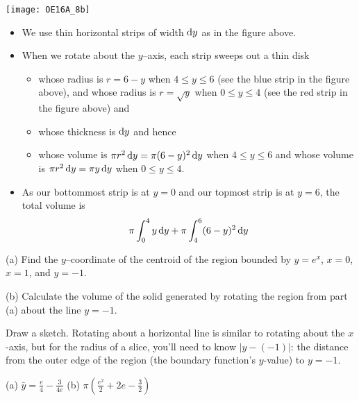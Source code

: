 \begin{solution}
\begin{center}
       \texttt{[image: OE16A\_8b]}
\end{center}

\noindent
 \begin{itemize}
\item We use thin horizontal  strips of width $\mathrm{d}y$ as in the figure  above.

\item When we rotate about the $y$--axis, each strip
sweeps out a thin disk
\begin{itemize}
\item
whose radius is $r=6-y$ when $4\le y\le 6$
(see the blue strip in the figure above),  and
whose radius is $r=\sqrt{y}$ when $0\le y\le 4$
(see the red strip in the figure above) and
\item
whose thickness is $\mathrm{d}y$ and hence
\item
whose volume is
$\pi r^2\,\mathrm{d}y
       = \pi(6-y)^2\,\mathrm{d}y$ when $4\le y\le 6$ and  whose volume is
$\pi r^2\,\mathrm{d}y
    =\pi y\,\mathrm{d}y$
when $0\le y\le 4$.

\end{itemize}
\item As our bottommost strip is at $y=0$ and our topmost
strip is at $y=6$, the total volume is
\begin{align*}
\pi \int_0^4 y\,\mathrm{d}y + \pi \int_4^6 (6-y)^2\,\mathrm{d}y
\end{align*}
\end{itemize}

\end{solution}


\begin{question}[2014D]
(a)
Find the $y$--coordinate of the centroid of the region bounded by
$y = e^x$, $x = 0$, $x = 1$, and $y = -1$.

\noindent (b)
Calculate the volume of the solid generated by rotating the region
from part (a) about the line $y = -1$.

\end{question}

\begin{hint}
Draw a sketch. Rotating about a horizontal line is similar to rotating about the $x$-axis, but for the radius of a slice, you'll need to know $|y-(-1)|$: the distance from the outer edge of the region (the boundary function's $y$-value) to $y=-1$.
\end{hint}

\begin{answer}
(a) $\displaystyle\bar y = \frac{e}{4} - \frac{3}{4e} $
\qquad (b) $\displaystyle\pi\left(\frac{e^{2}}{2}+2e -\frac{3}{2}\right)$
\end{answer}

